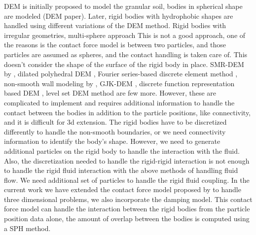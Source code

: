 \documentclass[preprint,12pt]{elsarticle}
\begin{document}
DEM is initially proposed to model the granular soil, bodies in spherical
shape are modeled (DEM paper). Later, rigid bodies with hydrophobic shapes are
handled using different variations of the DEM method. Rigid bodies with
irregular geometries, multi-sphere approach \cite{das2007modeling} This is not
a good approach, one of the reasons is the contact force model is between two
particles, and those particles are assumed as spheres, and the contact
handling is taken care of. This doesn't consider the shape of the surface of
the rigid body in place. SMR-DEM by \citet{zhan2021surface}, dilated
polyhedral DEM \citet{liu_new_2020}, Fourier series-based discrete element
method \citet{lai_fourier_2020}, non-smooth wall modeling by
\citet{amaro_junior_improvement_2019}, GJK-DEM \cite{wachs2012grains3d},
discrete function representation based DEM \cite{lu2012critical}, level set
DEM method \cite{duriez2021precision} are few more. However, these are
complicated to implement and requires additional information to handle the
contact between the bodies in addition to the particle positions, like
connectivity, and it is difficult for 3d extension. The rigid bodies have to
be discretized differently to handle the non-smooth boundaries, or we need
connectivity information to identify the body's shape. However, we need to
generate additional particles on the rigid body to handle the interaction with
the fluid. Also, the discretization needed to handle the rigid-rigid
interaction is not enough to handle the rigid fluid interaction with the above
methods of handling fluid flow. We need additional set of particles to handle
the rigid fluid coupling. In the current work we have extended the contact
force model proposed by \citet{mohseni2021particle} to handle three
dimensional problems, we also incorporate the damping model. This contact
force model can handle the interaction between the rigid bodies from the
particle position data alone, the amount of overlap between the bodies is
computed using a SPH method.
\end{document}
